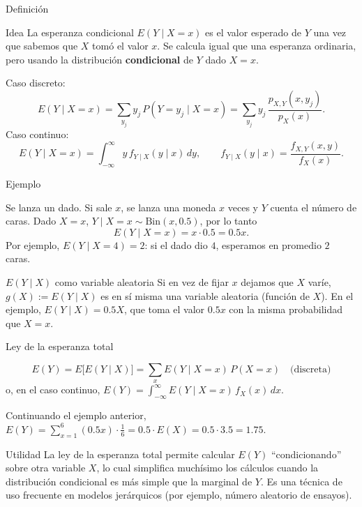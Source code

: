 \documentclass[aspectratio=169,11pt]{beamer}
\begin{document}
\begin{frame}{Definición}
\begin{block}{Idea}
La esperanza condicional $E(Y\mid X=x)$ es el valor esperado de $Y$ una vez que sabemos que $X$ tomó el valor $x$. Se calcula igual que una esperanza ordinaria, pero usando la distribución \textbf{condicional} de $Y$ dado $X=x$.
\end{block}

\begin{definition}
Caso discreto:
\[
E(Y \mid X=x) = \sum_{y_j} y_j\, P(Y=y_j \mid X=x) = \sum_{y_j} y_j\, \frac{p_{X,Y}(x,y_j)}{p_X(x)}.
\]
Caso continuo:
\[
E(Y \mid X=x) = \int_{-\infty}^{\infty} y\, f_{Y\mid X}(y\mid x)\, dy, \qquad f_{Y\mid X}(y\mid x) = \frac{f_{X,Y}(x,y)}{f_X(x)}.
\]
\end{definition}
\end{frame}

\begin{frame}{Ejemplo}
\begin{example}
Se lanza un dado. Si sale $x$, se lanza una moneda $x$ veces y $Y$ cuenta el número de caras. Dado $X=x$, $Y \mid X=x \sim \text{Bin}(x, 0.5)$, por lo tanto
\[
E(Y \mid X=x) = x \cdot 0.5 = 0.5x.
\]
Por ejemplo, $E(Y\mid X=4) = 2$: si el dado dio $4$, esperamos en promedio $2$ caras.
\end{example}

\begin{block}{$E(Y\mid X)$ como variable aleatoria}
Si en vez de fijar $x$ dejamos que $X$ varíe, $g(X) := E(Y\mid X)$ es en sí misma una variable aleatoria (función de $X$). En el ejemplo, $E(Y\mid X) = 0.5X$, que toma el valor $0.5x$ con la misma probabilidad que $X=x$.
\end{block}
\end{frame}

\begin{frame}{Ley de la esperanza total}
\begin{theorem}
\[
E(Y) = E\big[E(Y\mid X)\big] = \sum_x E(Y\mid X=x)\, P(X=x) \quad \text{(discreta)}
\]
o, en el caso continuo, $\displaystyle E(Y) = \int_{-\infty}^\infty E(Y\mid X=x)\, f_X(x)\, dx$.
\end{theorem}

\begin{example}
Continuando el ejemplo anterior, $E(Y) = \sum_{x=1}^{6} (0.5x)\cdot\frac16 = 0.5 \cdot E(X) = 0.5 \cdot 3.5 = 1.75$.
\end{example}

\begin{alertblock}{Utilidad}
La ley de la esperanza total permite calcular $E(Y)$ ``condicionando'' sobre otra variable $X$, lo cual simplifica muchísimo los cálculos cuando la distribución condicional es más simple que la marginal de $Y$. Es una técnica de uso frecuente en modelos jerárquicos (por ejemplo, número aleatorio de ensayos).
\end{alertblock}
\end{frame}
\end{document}
